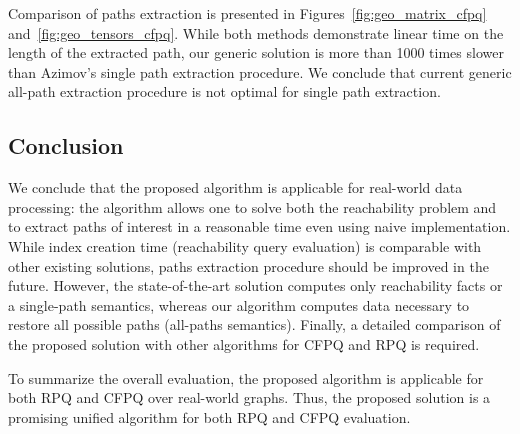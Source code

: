 Comparison of paths extraction is presented in Figures~\ref{fig:geo_matrix_cfpq} and~\ref{fig:geo_tensors_cfpq}.
While both methods demonstrate linear time on the length of the extracted path, our generic solution is more than 1000 times slower than Azimov's single path extraction procedure.
We conclude that current generic all-path extraction procedure is not optimal for single path extraction.

\subsection{Conclusion}

We conclude that the proposed algorithm is applicable for real-world data processing: the algorithm allows one to solve both the reachability problem and to extract paths of interest in a reasonable time even using naive implementation.
While index creation time (reachability query evaluation) is comparable with other existing solutions, paths extraction procedure should be improved in the future. However, the state-of-the-art solution computes only reachability facts or a single-path semantics, whereas our algorithm computes data necessary to restore all possible paths (all-paths semantics). 
Finally, a detailed comparison of the proposed solution with other algorithms for CFPQ and RPQ is required.

To summarize the overall evaluation, the proposed algorithm is applicable for both RPQ and CFPQ over real-world graphs.
Thus, the proposed solution is a promising unified algorithm for both RPQ and CFPQ evaluation.
